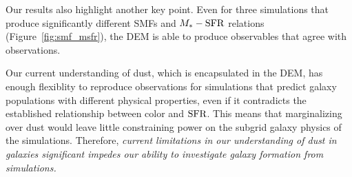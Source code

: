Our results also highlight another key point. Even for three
simulations that produce significantly different SMFs and $M_*-{\rm SFR}$ relations
(Figure~\ref{fig:smf_msfr}), the DEM is able to produce observables that agree
with observations. 



Our current understanding of dust, which is
encapsulated in the DEM, has enough flexiblity to reproduce observations 
for simulations that predict galaxy populations with different physical
properties, even if it contradicts the established relationship between color
and ${\rm SFR}$. This means that marginalizing over dust would leave little 
constraining power on the subgrid galaxy physics of the simulations. 
Therefore, \emph{current limitations in our understanding of dust in 
galaxies significant impedes our ability to investigate galaxy 
formation from simulations.}



